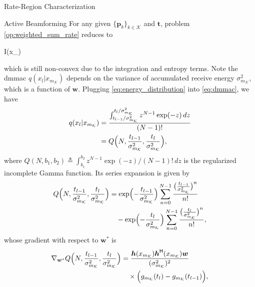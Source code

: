\begin{section}{Rate-Region Characterization}
	\begin{subsection}{Active Beamforming}
		For any given $\{\boldsymbol{p}_k\}_{k \in \mathcal{K}}$ and $\boldsymbol{t}$, problem \eqref{op:weighted_sum_rate} reduces to
		\begin{maxi!}
			{}{I(x_{})}{\label{op:active_beamforming}}{\label{ob:active_beamforming}}
			\addConstraint{\eqref{co:transmit_power},}
		\end{maxi!}
		which is still non-convex due to the integration and entropy terms.
		Note the \gls{dmmac} $q(x_l|x_{m_{\mathcal{K}}})$ depends on the variance of accumulated receive energy $\sigma_{m_{\mathcal{K}}}^2$, which is a function of $\boldsymbol{w}$.
		Plugging \eqref{eq:energy_distribution} into \eqref{eq:dmmac}, we have
		\begin{align}
			q(x_l|x_{m_{\mathcal{K}}})
			 & = \frac{\int_{{t_{l-1}}/{\sigma_{m_{\mathcal{K}}}^2}}^{{t_l}/{\sigma_{m_{\mathcal{K}}}^2}} z^{N-1} \exp(-z) \, d z}{(N-1)!} \\
			 & = Q\Bigl(N,\frac{t_{l-1}}{\sigma_{m_{\mathcal{K}}}^2},\frac{t_l}{\sigma_{m_{\mathcal{K}}}^2}\Bigr),
			\label{eq:dmmac_gamma}
		\end{align}
		where $Q(N, b_1, b_2) \triangleq \int_{b_1}^{b_2} z^{N-1} \exp(-z) / (N - 1)! \, d z$ is the regularized incomplete Gamma function.
		Its series expansion is given by \cite[Theorem 3]{Jameson2016}
		\begin{align}
			Q\Bigl(N,\frac{t_{l-1}}{\sigma_{m_{\mathcal{K}}}^2},\frac{t_l}{\sigma_{m_{\mathcal{K}}}^2}\Bigr)
			 & = \exp \Bigl(-\frac{t_{l-1}}{\sigma_{m_{\mathcal{K}}}^2}\Bigr) \sum_{n=0}^{N-1} \frac{\bigl(\frac{t_{l-1}}{\sigma_{m_{\mathcal{K}}}^2}\bigr)^n}{n!} \nonumber \\
			 & \quad - \exp \Bigl(-\frac{t_l}{\sigma_{m_{\mathcal{K}}}^2}\Bigr) \sum_{n=0}^{N-1} \frac{\bigl(\frac{t_l}{\sigma_{m_{\mathcal{K}}}^2}\bigr)^n}{n!},
			\label{eq:regularized_incomplete_gamma}
		\end{align}
		whose gradient with respect to $\boldsymbol{w}^*$ is
		\begin{align}
			\nabla_{\boldsymbol{w}^*} Q\Bigl(N,\frac{t_{l-1}}{\sigma_{m_{\mathcal{K}}}^2},\frac{t_l}{\sigma_{m_{\mathcal{K}}}^2}\Bigr)
			 & = \frac{\boldsymbol{h}(x_{m_{\mathcal{K}}})\boldsymbol{h}^\mathsf{H}(x_{m_{\mathcal{K}}})\boldsymbol{w}}{(\sigma_{m_{\mathcal{K}}}^2)^2} \nonumber \\
			 & \quad \times \Bigl(g_{m_{\mathcal{K}}}(t_l) - g_{m_{\mathcal{K}}}(t_{l-1})\Bigr),
			\label{eq:regularized_incomplete_gamma_gradient}

\end{align}
\end{subsection}
\end{section}
